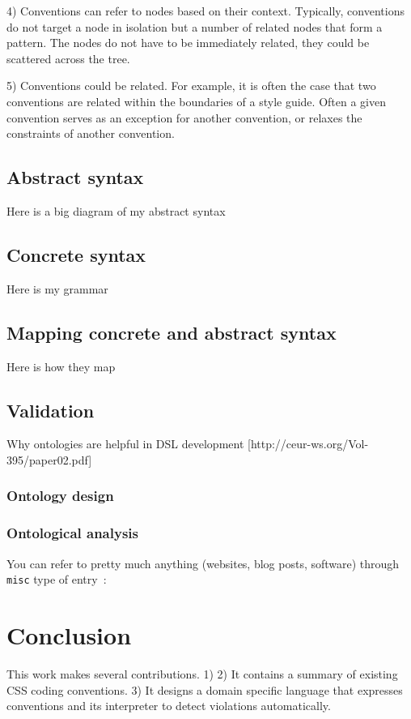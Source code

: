 \documentclass[parskip=full]{uvamscse}
\begin{document}
4) Conventions can refer to nodes based on their context. Typically, conventions do not target a
node in isolation but a number of related nodes that form a pattern. The nodes do not have to be
immediately related, they could be scattered across the tree.

5) Conventions could be related. For example, it is often the case that two conventions are related
within the boundaries of a style guide. Often a given convention serves as an exception for another
convention, or relaxes the constraints of another convention.


\section{Abstract syntax}

Here is a big diagram of my abstract syntax

\section{Concrete syntax}

Here is my grammar

\section{Mapping concrete and abstract syntax}

Here is how they map

\section{Validation}

Why ontologies are helpful in DSL development [http://ceur-ws.org/Vol-395/paper02.pdf]

\subsection{Ontology design}

\subsection{Ontological analysis}

You can refer to pretty much anything (websites, blog posts, software) through
\texttt{misc} type of entry~\cite{ANTLR}:


\chapter{Conclusion}

This work makes several contributions. 1) 2) It contains a summary of existing
CSS coding conventions. 3) It designs a domain specific language that expresses
conventions and its interpreter to detect violations automatically.

{%


}
\end{document}

